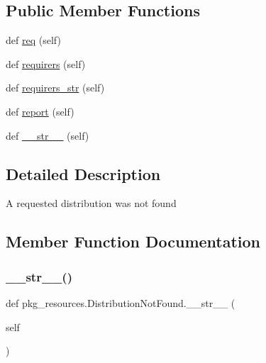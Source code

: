 \subsection*{Public Member Functions}
\begin{DoxyCompactItemize}
\item 
def \hyperlink{classpkg__resources_1_1DistributionNotFound_a8e314724660036b768d78dc21103c22f}{req} (self)
\item 
def \hyperlink{classpkg__resources_1_1DistributionNotFound_a9dbb675f62a1d689cb56637df1833c5e}{requirers} (self)
\item 
def \hyperlink{classpkg__resources_1_1DistributionNotFound_a02cc1e7ec9433f9e21ec80848317a5c0}{requirers\+\_\+str} (self)
\item 
def \hyperlink{classpkg__resources_1_1DistributionNotFound_a4a8415f4396d01b9d4a4ede6d58da543}{report} (self)
\item 
def \hyperlink{classpkg__resources_1_1DistributionNotFound_a58510603e72537a2a7b1eb75307a8fcc}{\+\_\+\+\_\+str\+\_\+\+\_\+} (self)
\end{DoxyCompactItemize}


\subsection{Detailed Description}
\begin{DoxyVerb}A requested distribution was not found\end{DoxyVerb}
 

\subsection{Member Function Documentation}
\mbox{\label{classpkg__resources_1_1DistributionNotFound_a58510603e72537a2a7b1eb75307a8fcc}} 
\subsubsection{\texorpdfstring{\+\_\+\+\_\+str\+\_\+\+\_\+()}{\_\_str\_\_()}}
{\footnotesize\ttfamily def pkg\+\_\+resources.\+Distribution\+Not\+Found.\+\_\+\+\_\+str\+\_\+\+\_\+ (\begin{DoxyParamCaption}\item[{}]{self }\end{DoxyParamCaption})}

